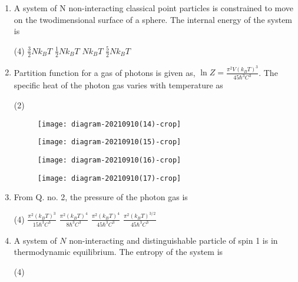 \begin{enumerate}
	\item A system of $\mathrm{N}$ non-interacting classical point particles is constrained to move on the twodimensional surface of a sphere. The internal energy of the system is
	{}
	\begin{tasks}(4)
		\task[\textbf{A.}] $\frac{3}{2} N k_{B} T$
		\task[\textbf{B.}] $\frac{1}{2} N k_{B} T$
		\task[\textbf{C.}] $N k_{B} T$
		\task[\textbf{D.}] $\frac{5}{2} N k_{B} T$
	\end{tasks}
	\item Partition function for a gas of photons is given as, $\ln Z=\frac{\pi^{2} V\left(k_{B} T\right)^{3}}{45 \hbar^{3} C^{3}}$. The specific heat of the photon gas varies with temperature as
	{}
	\begin{tasks}(2)
		\task[\textbf{A.}] \begin{figure}[H]
			\centering
			\texttt{[image: diagram-20210910(14)-crop]}
		\end{figure}
		\task[\textbf{B.}] \begin{figure}[H]
			\centering
			\texttt{[image: diagram-20210910(15)-crop]}
		\end{figure}
		\task[\textbf{C.}] \begin{figure}[H]
			\centering
			\texttt{[image: diagram-20210910(16)-crop]}
		\end{figure}
		\task[\textbf{D.}] \begin{figure}[H]
			\centering
			\texttt{[image: diagram-20210910(17)-crop]}
		\end{figure}
	\end{tasks}
	\item From Q. no. 2, the pressure of the photon gas is
	{}
	\begin{tasks}(4)
		\task[\textbf{A.}] $\frac{\pi^{2}\left(k_{B} T\right)^{3}}{15 \hbar^{3} C^{3}}$
		\task[\textbf{B.}]  $\frac{\pi^{2}\left(k_{B} T\right)^{4}}{8 \hbar^{3} C^{3}}$
		\task[\textbf{C.}] $\frac{\pi^{2}\left(k_{B} T\right)^{4}}{45 \hbar^{3} C^{3}}$
		\task[\textbf{D.}] $\frac{\pi^{2}\left(k_{B} T\right)^{3 / 2}}{45 \hbar^{3} C^{3}}$
	\end{tasks}
	\item A system of $N$ non-interacting and distinguishable particle of spin 1 is in thermodynamic equilibrium. The entropy of the system is
	{}
	\begin{tasks}(4)

\end{tasks}
\end{enumerate}
